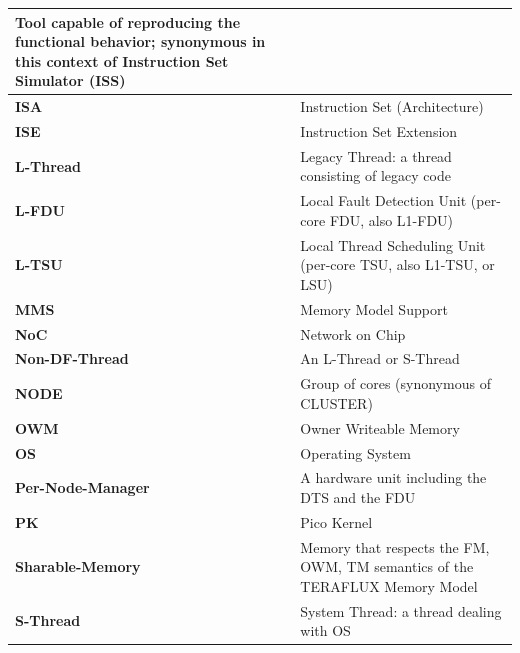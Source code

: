 \documentclass[a4paper]{article}
\begin{document}
{\begin{flushleft}
\begin{footnotesize}
\begin{supertabular}{m{1.3747599in}m{4.88586in}}
 Tool capable of reproducing the functional
behavior; synonymous in this context of Instruction Set Simulator
(ISS)\\\hline
\raggedleft {}\bfseries ISA &
 Instruction Set (Architecture)\\\hline
\raggedleft {}\bfseries ISE &
 Instruction Set Extension\\\hline
\raggedleft {}\bfseries L-Thread &
 Legacy Thread: a thread consisting of legacy
code\\\hline
\raggedleft {}\bfseries L-FDU &
 Local Fault Detection Unit (per-core FDU, also
L1-FDU)\\\hline
\raggedleft {}\bfseries L-TSU &
 Local Thread Scheduling Unit (per-core TSU,
also L1-TSU, or LSU)\\\hline
\raggedleft {}\bfseries MMS &
 Memory Model Support\\\hline
\raggedleft {}\bfseries NoC &
 Network on Chip\\\hline
\raggedleft {}\bfseries Non-DF-Thread &
 An L-Thread or S-Thread\\\hline
\raggedleft {}\bfseries NODE &
 Group of cores (synonymous of CLUSTER)\\\hline
\raggedleft {}\bfseries OWM &
 Owner Writeable Memory\\\hline
\raggedleft {}\bfseries OS &
 Operating System\\\hline
\raggedleft {}\bfseries Per-Node-Manager &
 A hardware unit including the DTS and the
FDU\\\hline
\raggedleft {}\bfseries PK \ \ \  &
 Pico Kernel\\\hline
\raggedleft {}\bfseries Sharable-Memory &
 Memory that respects the FM, OWM, TM semantics
of the TERAFLUX Memory Model\\\hline
\raggedleft {}\bfseries S-Thread &
 System Thread: a thread dealing with OS

\end{supertabular}
\end{footnotesize}
\end{flushleft}}
\end{document}
